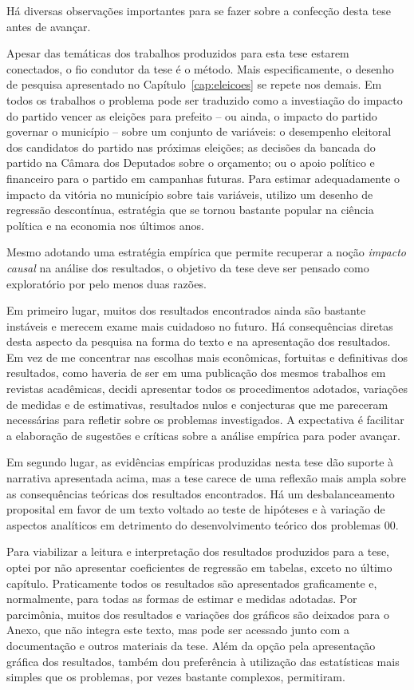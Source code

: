 Há diversas observações importantes para se fazer sobre a confecção desta tese antes de avançar.

Apesar das temáticas dos trabalhos produzidos para esta tese estarem conectados, o fio condutor da tese é o método. Mais especificamente, o desenho de pesquisa apresentado no Capítulo~\ref{cap:eleicoes} se repete nos demais. Em todos os trabalhos o problema pode ser traduzido como a investiação do impacto do partido vencer as eleições para prefeito -- ou ainda, o impacto do partido governar o município -- sobre um conjunto de variáveis: o desempenho eleitoral dos candidatos do partido nas próximas eleições; as decisões da bancada do partido na Câmara dos Deputados sobre o orçamento; ou o apoio político e financeiro para o partido em campanhas futuras. Para estimar adequadamente o impacto da vitória no município sobre tais variáveis, utilizo um desenho de regressão descontínua, estratégia que se tornou bastante popular na ciência política e na economia nos últimos anos.

Mesmo adotando uma estratégia empírica que permite recuperar a noção \emph{impacto causal} na análise dos resultados, o objetivo da tese deve ser pensado como exploratório por pelo menos duas razões.

Em primeiro lugar, muitos dos resultados encontrados ainda são bastante instáveis e merecem exame mais cuidadoso no futuro. Há consequências diretas desta aspecto da pesquisa na forma do texto e na apresentação dos resultados. Em vez de me concentrar nas escolhas mais econômicas, fortuitas e definitivas dos resultados, como haveria de ser em uma publicação dos mesmos trabalhos em revistas acadêmicas, decidi apresentar todos os procedimentos adotados, variações de medidas e de estimativas, resultados nulos e conjecturas que me pareceram necessárias para refletir sobre os problemas investigados. A expectativa é facilitar a elaboração de sugestões e críticas sobre a análise empírica para poder avançar.

Em segundo lugar, as evidências empíricas produzidas nesta tese dão suporte à narrativa apresentada acima, mas a tese carece de uma reflexão mais ampla sobre as consequências teóricas dos resultados encontrados. Há um desbalanceamento proposital em favor de um texto voltado ao teste de hipóteses e à variação de aspectos analíticos em detrimento do desenvolvimento teórico dos problemas 00.

Para viabilizar a leitura e interpretação dos resultados produzidos para a tese, optei por não apresentar coeficientes de regressão em tabelas, exceto no último capítulo. Praticamente todos os resultados são apresentados graficamente e, normalmente, para todas as formas de estimar e medidas adotadas. Por parcimônia, muitos dos resultados e variações dos gráficos são deixados para o Anexo, que não integra este texto, mas pode ser acessado junto com a documentação e outros materiais da tese. Além da opção pela apresentação gráfica dos resultados, também dou preferência à utilização das estatísticas mais simples que os problemas, por vezes bastante complexos, permitiram.

